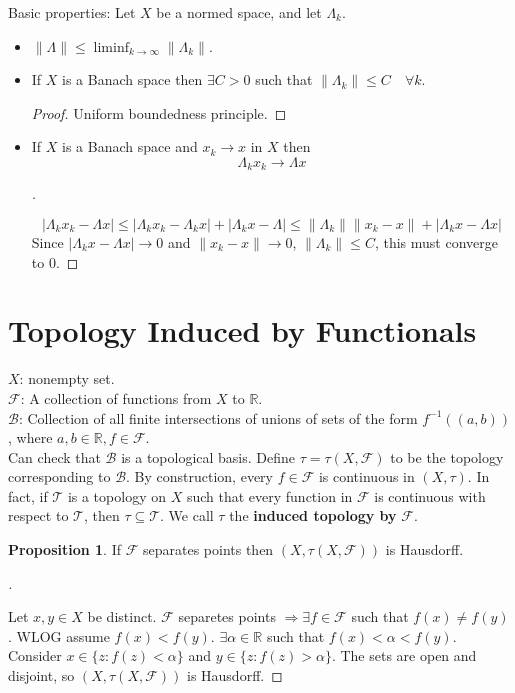 \documentclass{article}
\theoremstyle{definition}
\newtheorem{prop}{Proposition}
\newenvironment{proofs}[1][\proofname]{%
  \begin{proof}[#1]$ $\par\nobreak\ignorespaces
}{%
  \end{proof}
}
\newcommand{\B}{\mathcal B}
\newcommand{\F}{\mathcal F}
\newcommand{\RR}{\mathbb R}
\newcommand{\T}{\mathcal T}
\newcommand{\Ra}{\Rightarrow}
\begin{document}
Basic properties:
Let $X$ be a normed space, and let $\Lambda_k$. 
\begin{itemize}
	\item $\|\Lambda\| \leq \liminf_{k \to \infty} \|\Lambda_k\|$.
		
	\item If $X$ is a Banach space then $\exists C > 0$ such that $\|\Lambda_k\| \leq C \quad \forall k$.
		\begin{proof}
			Uniform boundedness principle.
		\end{proof}

	\item If $X$ is a Banach space and $x_k \to x$ in $X$ then 
		\[
			\Lambda_k x_k \to \Lambda x
		\]

		\begin{proofs}
			\[
				|\Lambda_k x_k - \Lambda x| \leq |\Lambda_k x_k - \Lambda_k x| + |\Lambda_k x - \Lambda| \leq \|\Lambda_k\|\|x_k - x\| + |\Lambda_k x - \Lambda x|
			\]
			Since $|\Lambda_k x - \Lambda x| \to 0$ and $\|x_k - x\| \to 0$, $\|\Lambda_k\| \leq C$, this must converge to 0.

		\end{proofs}
\end{itemize}

\section{Topology Induced by Functionals}
\noindent $X$: nonempty set.\\
$\F$: A collection of functions from $X$ to $\RR$.\\
$\B$: Collection of all finite intersections of unions of sets of the form $f^{-1}((a, b))$, where $a, b \in \RR, f \in \F$.\\
Can check that $\B$ is a topological basis.
Define $\tau = \tau(X, \F)$ to be the topology corresponding to $\B$.
By construction, every $f \in \F$ is continuous in $(X, \tau)$.
In fact, if $\T$ is a topology on $X$ such that every function in $\F$ is continuous with respect to $\T$, then $\tau \subseteq \T$.
We call $\tau$ the \textbf{induced topology by} $\F$.

\begin{prop}
	If $\F$ separates points then $(X, \tau(X, \F))$ is Hausdorff.
\end{prop}

\begin{proofs}
	Let $x, y \in X$ be distinct.
	$\F$ separetes points $\Ra \exists f \in \F$ such that $f(x) \neq f(y)$.
	WLOG assume $f(x) < f(y)$.
	$\exists \alpha \in \RR$ such that $f(x) < \alpha < f(y)$.
	Consider $x \in \{ z: f(z) < \alpha\}$ and $y \in \{z: f(z) > \alpha\}$.
	The sets are open and disjoint, so $(X, \tau(X, \F))$ is Hausdorff.
\end{proofs}
\end{document}
